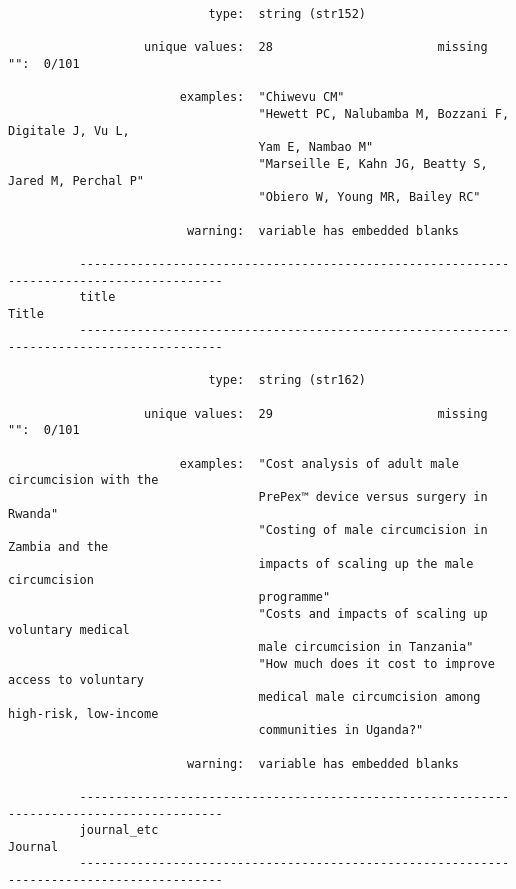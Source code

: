 \documentclass{article}
\begin{document}
\begin{verbatim}
                            type:  string (str152)
          
                   unique values:  28                       missing "":  0/101
          
                        examples:  "Chiwevu CM"
                                   "Hewett PC, Nalubamba M, Bozzani F, Digitale J, Vu L,
                                   Yam E, Nambao M"
                                   "Marseille E, Kahn JG, Beatty S, Jared M, Perchal P"
                                   "Obiero W, Young MR, Bailey RC"
          
                         warning:  variable has embedded blanks
          
          ------------------------------------------------------------------------------------------
          title                                                                                Title
          ------------------------------------------------------------------------------------------
          
                            type:  string (str162)
          
                   unique values:  29                       missing "":  0/101
          
                        examples:  "Cost analysis of adult male circumcision with the
                                   PrePex™ device versus surgery in Rwanda"
                                   "Costing of male circumcision in Zambia and the
                                   impacts of scaling up the male circumcision
                                   programme"
                                   "Costs and impacts of scaling up voluntary medical
                                   male circumcision in Tanzania"
                                   "How much does it cost to improve access to voluntary
                                   medical male circumcision among high-risk, low-income
                                   communities in Uganda?"
          
                         warning:  variable has embedded blanks
          
          ------------------------------------------------------------------------------------------
          journal_etc                                                                        Journal
          ------------------------------------------------------------------------------------------
          

\end{verbatim}
\end{document}
